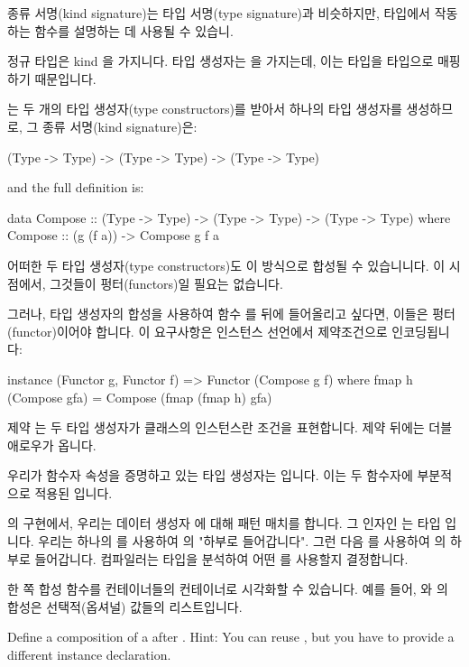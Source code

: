 \documentclass[DaoFP]{subfiles}
\begin{document}
종류 서명(kind signature)는 타입 서명(type signature)과 비슷하지만, 타입에서 작동하는 함수를 설명하는 데 사용될 수 있습니.

정규 타입은 kind 을 가지니다. 타입 생성자는 을 가지는데, 이는 타입을 타입으로 매핑하기 때문입니다.

는 두 개의 타입 생성자(type constructors)를 받아서 하나의 타입 생성자를 생성하므로, 그 종류 서명(kind signature)은:

\begin{haskell}
(Type -> Type) -> (Type -> Type) -> (Type -> Type) 
\end{haskell}
and the full definition is:
\begin{haskell}
data Compose :: (Type -> Type) -> (Type -> Type) -> (Type -> Type) 
  where
    Compose :: (g (f a)) -> Compose g f a
\end{haskell}

어떠한 두 타입 생성자(type constructors)도 이 방식으로 합성될 수 있습니니다. 이 시점에서, 그것들이 펑터(functors)일 필요는 없습니다.

그러나, 타입 생성자의 합성을 사용하여 함수 를  뒤에 들어올리고 싶다면, 이들은 펑터(functor)이어야 합니다. 이 요구사항은 인스턴스 선언에서 제약조건으로 인코딩됩니다:
\begin{haskell}
instance (Functor g, Functor f) => Functor (Compose g f) where
  fmap h (Compose gfa) = Compose (fmap (fmap h) gfa)
\end{haskell}
제약  는 두 타입 생성자가  클래스의 인스턴스란 조건을 표현합니다. 제약 뒤에는 더블 애로우가 옵니다.

우리가 함수자 속성을 증명하고 있는 타입 생성자는 입니다. 이는 두 함수자에 부분적으로 적용된 입니다.

의 구현에서, 우리는 데이터 생성자 에 대해 패턴 매치를 합니다. 그 인자인 는 타입 입니다. 우리는 하나의 를 사용하여 의 "하부로 들어갑니다". 그런 다음 를 사용하여 의 하부로 들어갑니다. 컴파일러는 타입을 분석하여 어떤 를 사용할지 결정합니다.

한 쪽 합성 함수를 컨테이너들의 컨테이너로 시각화할 수 있습니다. 예를 들어, \hask{[]}와 의 합성은 선택적(옵셔널) 값들의 리스트입니다.

\begin{exercise}
Define a composition of a  after . Hint: You can reuse , but you have to provide a different instance declaration.
\end{exercise}
\end{document}
